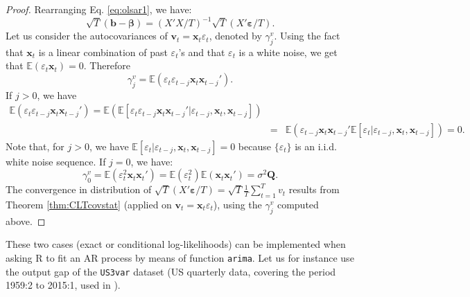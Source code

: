 \documentclass[
  12pt,
]{book}
\newenvironment{Shaded}{\begin{snugshade}}{\end{snugshade}}
\newcommand{\AttributeTok}[1]{\textcolor[rgb]{0.77,0.63,0.00}{#1}}
\newcommand{\DecValTok}[1]{\textcolor[rgb]{0.00,0.00,0.81}{#1}}
\newcommand{\FunctionTok}[1]{\textcolor[rgb]{0.00,0.00,0.00}{#1}}
\newcommand{\NormalTok}[1]{#1}
\newcommand{\OtherTok}[1]{\textcolor[rgb]{0.56,0.35,0.01}{#1}}
\newcommand{\SpecialCharTok}[1]{\textcolor[rgb]{0.00,0.00,0.00}{#1}}
\newcommand{\StringTok}[1]{\textcolor[rgb]{0.31,0.60,0.02}{#1}}
\theoremstyle{definition}
\theoremstyle{definition}
\theoremstyle{definition}
\theoremstyle{definition}
\theoremstyle{remark}
\begin{document}
\begin{proof}
Rearranging Eq. \eqref{eq:olsar1}, we have:
\[
\sqrt{T}(\mathbf{b}-\boldsymbol{\beta}) =  (X'X/T)^{-1}\sqrt{T}(X'\boldsymbol\varepsilon/T).
\]
Let us consider the autocovariances of \(\mathbf{v}_t = \mathbf{x}_t \varepsilon_t\), denoted by \(\gamma^v_j\). Using the fact that \(\mathbf{x}_t\) is a linear combination of past \(\varepsilon_t\)'s and that \(\varepsilon_t\) is a white noise, we get that \(\mathbb{E}(\varepsilon_t\mathbf{x}_t)=0\). Therefore
\[
\gamma^v_j = \mathbb{E}(\varepsilon_t\varepsilon_{t-j}\mathbf{x}_t\mathbf{x}_{t-j}').
\]
If \(j>0\), we have
\begin{eqnarray*}
\mathbb{E}(\varepsilon_t\varepsilon_{t-j}\mathbf{x}_t\mathbf{x}_{t-j}')=\mathbb{E}(\mathbb{E}[\varepsilon_t\varepsilon_{t-j}\mathbf{x}_t\mathbf{x}_{t-j}'|\varepsilon_{t-j},\mathbf{x}_t,\mathbf{x}_{t-j}])\\
&=&\mathbb{E}(\varepsilon_{t-j}\mathbf{x}_t\mathbf{x}_{t-j}'\mathbb{E}[\varepsilon_t|\varepsilon_{t-j},\mathbf{x}_t,\mathbf{x}_{t-j}])=0.
\end{eqnarray*}
Note that, for \(j>0\), we have \(\mathbb{E}[\varepsilon_t|\varepsilon_{t-j},\mathbf{x}_t,\mathbf{x}_{t-j}]=0\) because \(\{\varepsilon_t\}\) is an i.i.d. white noise sequence. If \(j=0\), we have:
\[
\gamma^v_0 = \mathbb{E}(\varepsilon_t^2\mathbf{x}_t\mathbf{x}_{t}')= \mathbb{E}(\varepsilon_t^2) \mathbb{E}(\mathbf{x}_t\mathbf{x}_{t}')=\sigma^2\mathbf{Q}.
\]
The convergence in distribution of \(\sqrt{T}(X'\boldsymbol\varepsilon/T)=\sqrt{T}\frac{1}{T}\sum_{t=1}^Tv_t\) results from Theorem \ref{thm:CLTcovstat} (applied on \(\mathbf{v}_t=\mathbf{x}_t\varepsilon_t\)), using the \(\gamma_j^v\) computed above.
\end{proof}

These two cases (exact or conditional log-likelihoods) can be implemented when asking R to fit an AR process by means of function \texttt{arima}. Let us for instance use the output gap of the \texttt{US3var} dataset (US quarterly data, covering the period 1959:2 to 2015:1, used in \citet{Gourieroux_Monfort_Renne_2017}).

\begin{Shaded}
\end{Shaded}
\end{document}

